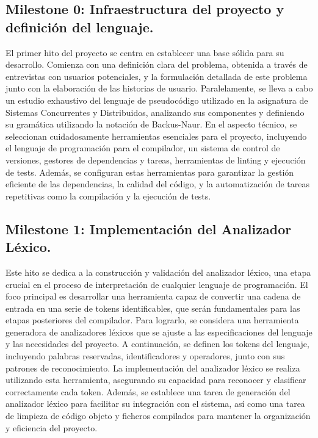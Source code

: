 \subsection{Milestone 0: Infraestructura del proyecto y definición del lenguaje.}\label{subsection:PMV0}
El primer hito del proyecto se centra en establecer una base sólida para su desarrollo. Comienza con una definición clara del problema, obtenida a través de entrevistas con usuarios potenciales, y la formulación detallada de este problema junto con la elaboración de las historias de usuario. Paralelamente, se lleva a cabo un estudio exhaustivo del lenguaje de pseudocódigo utilizado en la asignatura de Sistemas Concurrentes y Distribuidos, analizando sus componentes y definiendo su gramática utilizando la notación de Backus-Naur. En el aspecto técnico, se seleccionan cuidadosamente herramientas esenciales para el proyecto, incluyendo el lenguaje de programación para el compilador, un sistema de control de versiones, gestores de dependencias y tareas, herramientas de linting y ejecución de tests. Además, se configuran estas herramientas para garantizar la gestión eficiente de las dependencias, la calidad del código, y la automatización de tareas repetitivas como la compilación y la ejecución de tests.

\subsection{Milestone 1: Implementación del Analizador Léxico.}\label{subsection:PMV1}
Este hito se dedica a la construcción y validación del analizador léxico, una etapa crucial en el proceso de interpretación de cualquier lenguaje de programación. El foco principal es desarrollar una herramienta capaz de convertir una cadena de entrada en una serie de tokens identificables, que serán fundamentales para las etapas posteriores del compilador. Para lograrlo, se considera una herramienta generadora de analizadores léxicos que se ajuste a las especificaciones del lenguaje y las necesidades del proyecto. A continuación, se definen los tokens del lenguaje, incluyendo palabras reservadas, identificadores y operadores, junto con sus patrones de reconocimiento. La implementación del analizador léxico se realiza utilizando esta herramienta, asegurando su capacidad para reconocer y clasificar correctamente cada token. Además, se establece una tarea de generación del analizador léxico para facilitar su integración con el sistema, así como una tarea de limpieza de código objeto y ficheros compilados para mantener la organización y eficiencia del proyecto.

